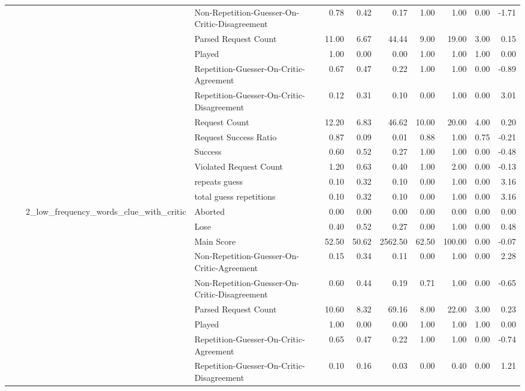 \begin{tabular}{llllrrrrrrr}
 &  &  & Non-Repetition-Guesser-On-Critic-Disagreement & 0.78 & 0.42 & 0.17 & 1.00 & 1.00 & 0.00 & -1.71 \\
 &  &  & Parsed Request Count & 11.00 & 6.67 & 44.44 & 9.00 & 19.00 & 3.00 & 0.15 \\
 &  &  & Played & 1.00 & 0.00 & 0.00 & 1.00 & 1.00 & 1.00 & 0.00 \\
 &  &  & Repetition-Guesser-On-Critic-Agreement & 0.67 & 0.47 & 0.22 & 1.00 & 1.00 & 0.00 & -0.89 \\
 &  &  & Repetition-Guesser-On-Critic-Disagreement & 0.12 & 0.31 & 0.10 & 0.00 & 1.00 & 0.00 & 3.01 \\
 &  &  & Request Count & 12.20 & 6.83 & 46.62 & 10.00 & 20.00 & 4.00 & 0.20 \\
 &  &  & Request Success Ratio & 0.87 & 0.09 & 0.01 & 0.88 & 1.00 & 0.75 & -0.21 \\
 &  &  & Success & 0.60 & 0.52 & 0.27 & 1.00 & 1.00 & 0.00 & -0.48 \\
 &  &  & Violated Request Count & 1.20 & 0.63 & 0.40 & 1.00 & 2.00 & 0.00 & -0.13 \\
 &  &  & repeats guess & 0.10 & 0.32 & 0.10 & 0.00 & 1.00 & 0.00 & 3.16 \\
 &  &  & total guess repetitions & 0.10 & 0.32 & 0.10 & 0.00 & 1.00 & 0.00 & 3.16 \\
\cline{3-11}
 &  & \multirow[t]{15}{*}{2_low_frequency_words_clue_with_critic} & Aborted & 0.00 & 0.00 & 0.00 & 0.00 & 0.00 & 0.00 & 0.00 \\
 &  &  & Lose & 0.40 & 0.52 & 0.27 & 0.00 & 1.00 & 0.00 & 0.48 \\
 &  &  & Main Score & 52.50 & 50.62 & 2562.50 & 62.50 & 100.00 & 0.00 & -0.07 \\
 &  &  & Non-Repetition-Guesser-On-Critic-Agreement & 0.15 & 0.34 & 0.11 & 0.00 & 1.00 & 0.00 & 2.28 \\
 &  &  & Non-Repetition-Guesser-On-Critic-Disagreement & 0.60 & 0.44 & 0.19 & 0.71 & 1.00 & 0.00 & -0.65 \\
 &  &  & Parsed Request Count & 10.60 & 8.32 & 69.16 & 8.00 & 22.00 & 3.00 & 0.23 \\
 &  &  & Played & 1.00 & 0.00 & 0.00 & 1.00 & 1.00 & 1.00 & 0.00 \\
 &  &  & Repetition-Guesser-On-Critic-Agreement & 0.65 & 0.47 & 0.22 & 1.00 & 1.00 & 0.00 & -0.74 \\
 &  &  & Repetition-Guesser-On-Critic-Disagreement & 0.10 & 0.16 & 0.03 & 0.00 & 0.40 & 0.00 & 1.21 \\

\end{tabular}
